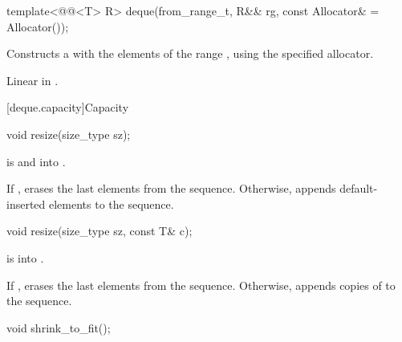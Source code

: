 %
\begin{itemdecl}
template<@@<T> R>
  deque(from_range_t, R&& rg, const Allocator& = Allocator());
\end{itemdecl}

\begin{itemdescr}
\pnum
\effects
Constructs a  with the elements of the range ,
using the specified allocator.

\pnum
\complexity
Linear in .
\end{itemdescr}

[deque.capacity]{Capacity}

%
\begin{itemdecl}
void resize(size_type sz);
\end{itemdecl}

\begin{itemdescr}
\pnum
\expects
{} is  and  into .

\pnum
\effects
If , erases the last  elements
from the sequence. Otherwise,
appends  default-inserted elements to the sequence.
\end{itemdescr}

%
\begin{itemdecl}
void resize(size_type sz, const T& c);
\end{itemdecl}

\begin{itemdescr}
\pnum
\expects
{} is  into .

\pnum
\effects
If , erases the last  elements
from the sequence. Otherwise,
appends  copies of  to the sequence.
\end{itemdescr}

%
\begin{itemdecl}
void shrink_to_fit();
\end{itemdecl}

